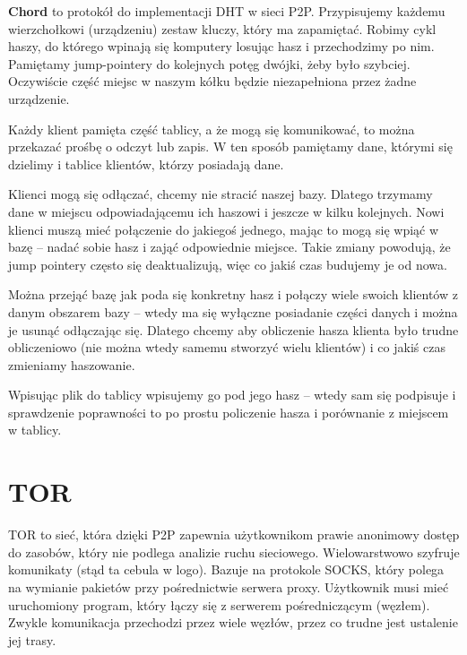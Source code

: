 \textbf{Chord} to protokół do implementacji DHT w sieci P2P. Przypisujemy każdemu wierzchołkowi (urządzeniu) zestaw kluczy, który ma zapamiętać. Robimy cykl haszy, do którego wpinają się komputery losując hasz i przechodzimy po nim. Pamiętamy jump-pointery do kolejnych potęg dwójki, żeby było szybciej. Oczywiście część miejsc w naszym kółku będzie niezapełniona przez żadne urządzenie.

Każdy klient pamięta część tablicy, a że mogą się komunikować, to można przekazać prośbę o odczyt lub zapis. W ten sposób pamiętamy dane, którymi się dzielimy i tablice klientów, którzy posiadają dane.

Klienci mogą się odłączać, chcemy nie stracić naszej bazy. Dlatego trzymamy dane w miejscu odpowiadającemu ich haszowi i jeszcze w kilku kolejnych. Nowi klienci muszą mieć połączenie do jakiegoś jednego, mając to mogą się wpiąć w bazę -- nadać sobie hasz i zająć odpowiednie miejsce. Takie zmiany powodują, że jump pointery często się deaktualizują, więc co jakiś czas budujemy je od nowa.

Można przejąć bazę jak poda się konkretny hasz i połączy wiele swoich klientów z danym obszarem bazy -- wtedy ma się wyłączne posiadanie części danych i można je usunąć odłączając się. Dlatego chcemy aby obliczenie hasza klienta było trudne obliczeniowo (nie można wtedy samemu stworzyć wielu klientów) i co jakiś czas zmieniamy haszowanie.

Wpisując plik do tablicy wpisujemy go pod jego hasz -- wtedy sam się podpisuje i sprawdzenie poprawności to po prostu policzenie hasza i porównanie z miejscem w tablicy.

\section{TOR}
TOR to sieć, która dzięki P2P zapewnia użytkownikom prawie anonimowy dostęp do zasobów, który nie podlega analizie ruchu sieciowego. Wielowarstwowo szyfruje komunikaty (stąd ta cebula w logo). Bazuje na protokole SOCKS, który polega na wymianie pakietów przy pośrednictwie serwera proxy.  Użytkownik musi mieć uruchomiony program, który łączy się z serwerem pośredniczącym (węzłem). Zwykle komunikacja przechodzi przez wiele węzłów, przez co trudne jest ustalenie jej trasy.
